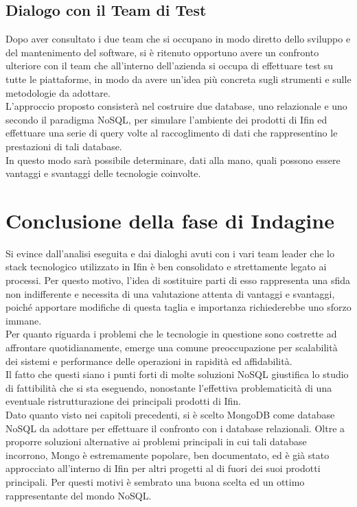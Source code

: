 \subsection{Dialogo con il Team di Test}
Dopo aver consultato i due team che si occupano in modo diretto dello sviluppo e del mantenimento del software, si è ritenuto opportuno avere un confronto ulteriore con il team che all'interno dell'azienda si occupa di effettuare test su tutte le piattaforme, in modo da avere un'idea più concreta sugli strumenti e sulle metodologie da adottare.\\
L'approccio proposto consisterà nel costruire due database, uno relazionale e uno secondo il paradigma NoSQL, per simulare l'ambiente dei prodotti di Ifin ed effettuare una serie di query volte al raccoglimento di dati che rappresentino le prestazioni di tali database.\\
In questo modo sarà possibile determinare, dati alla mano, quali possono essere vantaggi e svantaggi delle tecnologie coinvolte.\\


\section{Conclusione della fase di Indagine}

Si evince dall'analisi eseguita e dai dialoghi avuti con i vari team leader che lo stack tecnologico utilizzato in Ifin è ben consolidato e strettamente legato ai processi. Per questo motivo, l'idea di sostituire parti di esso rappresenta una sfida non indifferente e necessita di una valutazione attenta di vantaggi e svantaggi, poiché apportare modifiche di questa taglia e importanza richiederebbe uno sforzo immane.\\
Per quanto riguarda i problemi che le tecnologie in questione sono costrette ad affrontare quotidianamente, emerge una comune preoccupazione per scalabilità dei sistemi e performance delle operazioni in rapidità ed affidabilità.\\
Il fatto che questi siano i punti forti di molte soluzioni NoSQL giustifica lo studio di fattibilità che si sta eseguendo, nonostante l'effettiva problematicità di una eventuale ristrutturazione dei principali prodotti di Ifin.\\

\noindent Dato quanto visto nei capitoli precedenti, si è scelto MongoDB come database NoSQL da adottare per effettuare il confronto con i database relazionali. Oltre a proporre soluzioni alternative ai problemi principali in cui tali database incorrono, Mongo è estremamente popolare, ben documentato, ed è già stato approcciato all'interno di Ifin per altri progetti al di fuori dei suoi prodotti principali. Per questi motivi è sembrato una buona scelta ed un ottimo rappresentante del mondo NoSQL.\\

